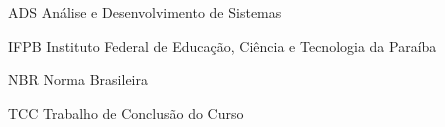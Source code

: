 %
%

\begin{siglas}
	\setlength{\baselineskip}{0.7\baselineskip}
	
    \item[ADS] Análise e Desenvolvimento de Sistemas
    \item[IFPB] Instituto Federal de Educação, Ciência e Tecnologia da Paraíba
    \item[NBR] Norma Brasileira
    \item[TCC] Trabalho de Conclusão do Curso
    
\end{siglas}
